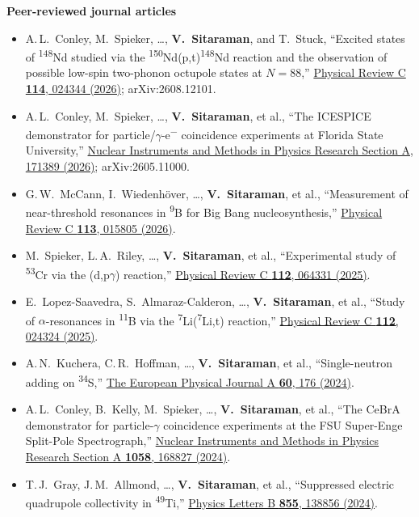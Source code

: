 \documentclass[10pt,letterpaper]{article}
\newcommand{\subhead}[1]{\par\addvspace{3pt}\noindent\textbf{#1}\par\nopagebreak}
\newcommand{\iso}[2]{\textsuperscript{#1}#2}
\newcommand{\me}{\textbf{V.~Sitaraman}}
\begin{document}
\subhead{Peer-reviewed journal articles}
\begin{itemize}
  \item A.\,L.\ Conley, M.\ Spieker, \ldots, \me, and T.\ Stuck, ``Excited states of \iso{148}{Nd} studied via the \iso{150}{Nd}(p,t)\iso{148}{Nd} reaction and the observation of possible low-spin two-phonon octupole states at $N = 88$,'' \href{https://doi.org/10.1103/c1xc-2hdz}{Physical Review C \textbf{114}, 024344 (2026)}; arXiv:2608.12101.
  \item A.\,L.\ Conley, M.\ Spieker, \ldots, \me, et al., ``The ICESPICE demonstrator for particle/\ensuremath{\gamma}-e\textsuperscript{$-$} coincidence experiments at Florida State University,'' \href{https://www.sciencedirect.com/science/article/abs/pii/S0168900226001154}{Nuclear Instruments and Methods in Physics Research Section A, 171389 (2026)}; arXiv:2605.11000.
  \item G.\,W.\ McCann, I.\ Wiedenhöver, \ldots, \me, et al., ``Measurement of near-threshold resonances in \iso{9}{B} for Big Bang nucleosynthesis,'' \href{https://doi.org/10.1103/37y9-m3yb}{Physical Review C \textbf{113}, 015805 (2026)}.
  \item M.\ Spieker, L.\,A.\ Riley, \ldots, \me, et al., ``Experimental study of \iso{53}{Cr} via the (d,p\ensuremath{\gamma}) reaction,'' \href{https://doi.org/10.1103/wp85-rthk}{Physical Review C \textbf{112}, 064331 (2025)}.
  \item E.\ Lopez-Saavedra, S.\ Almaraz-Calderon, \ldots, \me, et al., ``Study of \ensuremath{\alpha}-resonances in \iso{11}{B} via the \iso{7}{Li}(\iso{7}{Li},t) reaction,'' \href{https://doi.org/10.1103/wsf3-2sh6}{Physical Review C \textbf{112}, 024324 (2025)}.
  \item A.\,N.\ Kuchera, C.\,R.\ Hoffman, \ldots, \me, et al., ``Single-neutron adding on \iso{34}{S},'' \href{https://doi.org/10.1140/epja/s10050-024-01399-z}{The European Physical Journal A \textbf{60}, 176 (2024)}.
  \item A.\,L.\ Conley, B.\ Kelly, M.\ Spieker, \ldots, \me, et al., ``The CeBrA demonstrator for particle-\ensuremath{\gamma} coincidence experiments at the FSU Super-Enge Split-Pole Spectrograph,'' \href{https://doi.org/10.1016/j.nima.2023.168827}{Nuclear Instruments and Methods in Physics Research Section A \textbf{1058}, 168827 (2024)}.
  \item T.\,J.\ Gray, J.\,M.\ Allmond, \ldots, \me, et al., ``Suppressed electric quadrupole collectivity in \iso{49}{Ti},'' \href{https://doi.org/10.1016/j.physletb.2024.138856}{Physics Letters B \textbf{855}, 138856 (2024)}.
\end{itemize}
\end{document}
